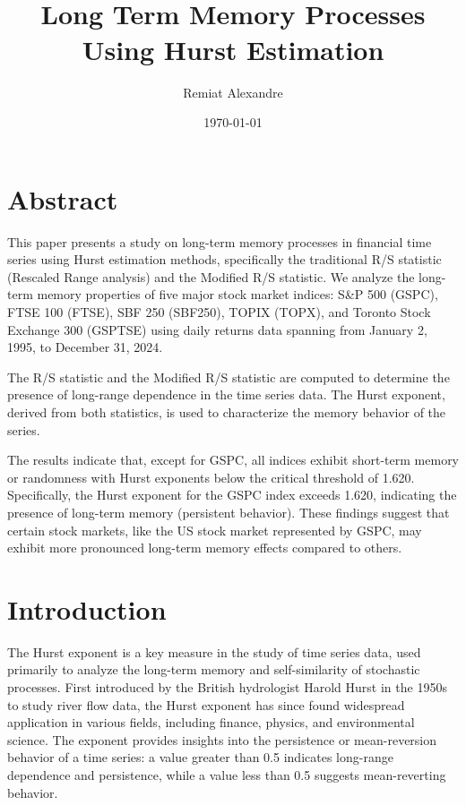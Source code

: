 \documentclass[11pt]{extarticle}
\title{
    \hspace*{-12cm}
    \vspace*{1cm}
    \protect\\
    \vspace*{1cm}
    \textbf{Long Term Memory Processes Using Hurst Estimation}
}
\author{Remiat Alexandre}
\date{\today}
\begin{document}

\maketitle

\vspace{1.5cm}
{
  \hypersetup{linkcolor=black}
  \tableofcontents
}

\newpage


\section*{Abstract}

This paper presents a study on long-term memory processes in financial time series using Hurst estimation methods, specifically the traditional R/S statistic (Rescaled Range analysis) and the Modified R/S statistic.
We analyze the long-term memory properties of five major stock market indices: S\&P 500 (GSPC), FTSE 100 (FTSE), SBF 250 (SBF250), TOPIX (TOPX), and Toronto Stock Exchange 300 (GSPTSE) using daily returns data spanning from January 2, 1995, to December 31, 2024.

The R/S statistic and the Modified R/S statistic are computed to determine the presence of long-range dependence in the time series data. The Hurst exponent, derived from both statistics, is used to characterize the memory behavior of the series.

The results indicate that, except for GSPC, all indices exhibit short-term memory or randomness with Hurst exponents below the critical threshold of 1.620.
Specifically, the Hurst exponent for the GSPC index exceeds 1.620, indicating the presence of long-term memory (persistent behavior).
These findings suggest that certain stock markets, like the US stock market represented by GSPC, may exhibit more pronounced long-term memory effects compared to others.


\newpage

\section{Introduction}

The Hurst exponent is a key measure in the study of time series data, used primarily to analyze the long-term memory and self-similarity of stochastic processes. First introduced by the British hydrologist Harold Hurst in the 1950s to study river flow data, the Hurst exponent has since found widespread application in various fields, including finance, physics, and environmental science. The exponent provides insights into the persistence or mean-reversion behavior of a time series: a value greater than 0.5 indicates long-range dependence and persistence, while a value less than 0.5 suggests mean-reverting behavior.
\end{document}
